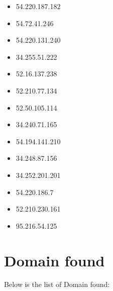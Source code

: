 \documentclass{article}
\begin{document}
\begin{itemize}
        \item 54.220.187.182
    
        \item 54.72.41.246
    
        \item 54.220.131.240
    
        \item 34.255.51.222
    
        \item 52.16.137.238
    
        \item 52.210.77.134
    
        \item 52.50.105.114
    
        \item 34.240.71.165
    
        \item 54.194.141.210
    
        \item 34.248.87.156
    
        \item 34.252.201.201
    
        \item 54.220.186.7
    
        \item 52.210.230.161
    
        \item 95.216.54.125
    
\end{itemize}


\section*{Domain found}

Below is the list of Domain found:
\end{document}
